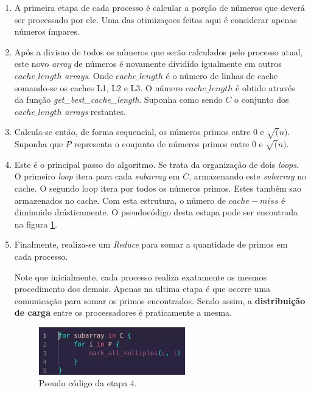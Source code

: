 \documentclass[a4paper, 12 pt]{article}
\begin{document}
\begin{enumerate}

\item A primeira etapa de cada processo é calcular a porção de números que deverá ser processado por ele. Uma das otimizaçoes
feitas aqui é considerar apenas números ímpares.

\item Após a divisao de todos os números que serão calculados pelo processo atual, este novo
\textit{array} de números é novamente dividido igualmente em outros $cache\_length$ \textit{arrays}. Onde $cache\_length$ é
o número de linhas de cache somando-se os caches L1, L2 e L3. O número $cache\_length$ é obtido através da função
\textit{get\_best\_cache\_length}. Suponha como sendo $C$ o conjunto dos $cache\_length$ \textit{arrays} restantes.

\item Calcula-se então, de forma sequencial, os números primos entre $0$ e $\sqrt(n)$. Suponha que $P$ representa
o conjunto de números primos entre $0$ e $\sqrt(n)$.

\item Este é o principal passo do algoritmo. Se trata da organização de dois \textit{loops}. O primeiro \textit{loop} itera
para cada \textit{subarray} em $C$, armazenando este \textit{subarray} no cache. O segundo loop itera por todos os números primos. Estes também sao armazenados no cache.
Com esta estrutura, o número de $cache-miss$ é diminuido drásticamente. O pseudocódigo desta estapa pode ser encontrada na figura \ref{fig:pseudo}.

\item Finalmente, realiza-se um \textit{Reduce} para somar a quantidade de primos em cada processo.

Note que inicialmente, cada processo realiza exatamente os mesmos procedimento dos demais. Apenas na ultima etapa é que ocorre uma comunicação
para somar os primos encontrados. Sendo assim, a \textbf{distribuição de carga} entre os processadores é praticamente a mesma.

\begin{figure}[h]
    \centering
    \includegraphics[width=0.6\textwidth]{figure-0.png}
    \caption{Pseudo código da etapa 4.}
    \label{fig:pseudo}
\end{figure}

\end{enumerate}
\end{document}
